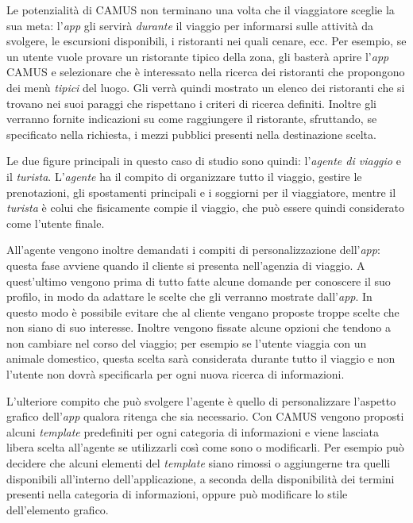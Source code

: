 Le potenzialità di CAMUS non terminano una volta che il viaggiatore sceglie la sua meta: l'\emph{app} gli servirà \emph{durante} il viaggio per informarsi sulle attività da svolgere, le escursioni disponibili, i ristoranti nei quali cenare, ecc. Per esempio, se un utente vuole provare un ristorante tipico della zona, gli basterà aprire l'\emph{app} CAMUS e selezionare che è interessato nella ricerca dei ristoranti che propongono dei menù \emph{tipici} del luogo. Gli verrà quindi mostrato un elenco dei ristoranti che si trovano nei suoi paraggi che rispettano i criteri di ricerca definiti. Inoltre gli verranno fornite indicazioni su come raggiungere il ristorante, sfruttando, se specificato nella richiesta, i mezzi pubblici presenti nella destinazione scelta.

Le due figure principali in questo caso di studio sono quindi: l'\emph{agente di viaggio} e il \emph{turista}. L'\emph{agente} ha il compito di organizzare tutto il viaggio, gestire le prenotazioni, gli spostamenti principali e i soggiorni per il viaggiatore, mentre il \emph{turista} è colui che fisicamente compie il viaggio, che può essere quindi considerato come l'utente finale.

All'agente vengono inoltre demandati i compiti di personalizzazione dell'\emph{app}: questa fase avviene quando il cliente si presenta nell'agenzia di viaggio. A quest'ultimo vengono prima di tutto fatte alcune domande per conoscere il suo profilo, in modo da adattare le scelte che gli verranno mostrate dall'\emph{app}. In questo modo è possibile evitare che al cliente vengano proposte troppe scelte che non siano di suo interesse. Inoltre vengono fissate alcune opzioni che tendono a non cambiare nel corso del viaggio; per esempio se l'utente viaggia con un animale domestico, questa scelta sarà considerata durante tutto il viaggio e non l'utente non dovrà specificarla per ogni nuova ricerca di informazioni. %

L'ulteriore compito che può svolgere l'agente è quello di personalizzare l'aspetto grafico dell'\emph{app} qualora ritenga che sia necessario. Con CAMUS vengono proposti alcuni \emph{template} predefiniti per ogni categoria di informazioni e viene lasciata libera scelta all'agente se utilizzarli così come sono o modificarli. Per esempio può decidere che alcuni elementi del \emph{template} siano rimossi o aggiungerne tra quelli disponibili all'interno dell'applicazione, a seconda della disponibilità dei termini presenti nella categoria di informazioni, oppure può modificare lo stile dell'elemento grafico.

